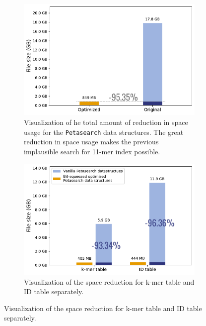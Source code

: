\begin{figpage}
  \captionsetup[figure]{width=.9\linewidth}
  \captionsetup[subfigure]{
    width=.9\linewidth
  }
  \centering
  \begin{figure}
    \begin{subfigure}{0.5\textwidth}
      \centering
      \includegraphics[width=\textwidth]{images/bitsqueeze_alternative.pdf}
      \centering
      \caption{Visualization of he total amount of reduction in space usage for the \texttt{Petasearch} data structures.
The great reduction in space usage makes the previous implausible search for 11-mer index possible.}
      \label{fig:total_effect_of_bitsqueeze}
    \end{subfigure}
    \begin{subfigure}{0.5\textwidth}
      \centering
      \includegraphics[width=\textwidth]{images/bitsqueeze_optimization.pdf}
      \caption{Visualization of the space reduction for k-mer table and ID table separately.
}
\end{subfigure}
\end{figure}
\end{figpage}
